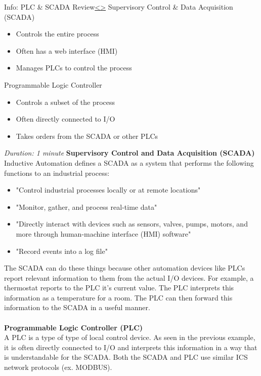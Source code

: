 \documentclass[12pt]{extarticle}
\newenvironment{instructionblock}{\Large\bgroup}{\egroup}
\newcommand{\bi}{\begin{itemize}}
\newcommand{\ei}{\end{itemize}}
\newcounter{next}
\newcounter{prev}
\begin{document}
\pagebreak
{}
\begin{slide}{Info: PLC \& SCADA Review}{\hyperref[slide \theprev]{\textless}\hyperref[slide \thenext]{\textgreater}}
	\begin{instructionblock}
		Supervisory Control \& Data Acquisition (SCADA)
		\bi
			\item Controls the entire process
			\item Often has a web interface (HMI)
			\item Manages PLCs to control the process
		\ei
		Programmable Logic Controller
		\bi
			\item Controls a subset of the process
			\item Often directly connected to I/O
			\item Takes orders from the SCADA or other PLCs
		\ei
	\end{instructionblock}
\end{slide}
\textit{Duration: 1 minute}
\vfill
\noindent
\textbf{Supervisory Control and Data Acquisition (SCADA)}\\
Inductive Automation\cite{inductAuto} defines a SCADA as a system that performs the following functions to an industrial process:
\bi
	\item "Control industrial processes locally or at remote locations"
	\item "Monitor, gather, and process real-time data"
	\item "Directly interact with devices such as sensors, valves, pumps, motors, and more through human-machine interface (HMI) software"
	\item "Record events into a log file"
\ei
The SCADA can do these things because other automation devices like PLCs report relevant information to them from the actual I/O devices. For example, a thermostat reports to the PLC it's current value. The PLC interprets this information as a temperature for a room. The PLC can then forward this information to the SCADA in a useful manner. \\\\
\textbf{Programmable Logic Controller (PLC)}\\
A PLC is a type of type of local control device. As seen in the previous example, it is often directly connected to I/O and interprets this information in a way that is understandable for the SCADA. Both the SCADA and PLC use similar ICS network protocols (ex. MODBUS). 
\pagebreak
\end{document}
